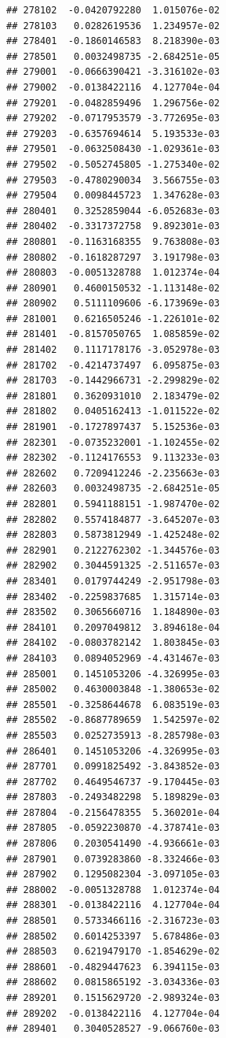 \begin{frame}[fragile]
\begin{verbatim}
## 278102  -0.0420792280  1.015076e-02
## 278103   0.0282619536  1.234957e-02
## 278401  -0.1860146583  8.218390e-03
## 278501   0.0032498735 -2.684251e-05
## 279001  -0.0666390421 -3.316102e-03
## 279002  -0.0138422116  4.127704e-04
## 279201  -0.0482859496  1.296756e-02
## 279202  -0.0717953579 -3.772695e-03
## 279203  -0.6357694614  5.193533e-03
## 279501  -0.0632508430 -1.029361e-03
## 279502  -0.5052745805 -1.275340e-02
## 279503  -0.4780290034  3.566755e-03
## 279504   0.0098445723  1.347628e-03
## 280401   0.3252859044 -6.052683e-03
## 280402  -0.3317372758  9.892301e-03
## 280801  -0.1163168355  9.763808e-03
## 280802  -0.1618287297  3.191798e-03
## 280803  -0.0051328788  1.012374e-04
## 280901   0.4600150532 -1.113148e-02
## 280902   0.5111109606 -6.173969e-03
## 281001   0.6216505246 -1.226101e-02
## 281401  -0.8157050765  1.085859e-02
## 281402   0.1117178176 -3.052978e-03
## 281702  -0.4214737497  6.095875e-03
## 281703  -0.1442966731 -2.299829e-02
## 281801   0.3620931010  2.183479e-02
## 281802   0.0405162413 -1.011522e-02
## 281901  -0.1727897437  5.152536e-03
## 282301  -0.0735232001 -1.102455e-02
## 282302  -0.1124176553  9.113233e-03
## 282602   0.7209412246 -2.235663e-03
## 282603   0.0032498735 -2.684251e-05
## 282801   0.5941188151 -1.987470e-02
## 282802   0.5574184877 -3.645207e-03
## 282803   0.5873812949 -1.425248e-02
## 282901   0.2122762302 -1.344576e-03
## 282902   0.3044591325 -2.511657e-03
## 283401   0.0179744249 -2.951798e-03
## 283402  -0.2259837685  1.315714e-03
## 283502   0.3065660716  1.184890e-03
## 284101   0.2097049812  3.894618e-04
## 284102  -0.0803782142  1.803845e-03
## 284103   0.0894052969 -4.431467e-03
## 285001   0.1451053206 -4.326995e-03
## 285002   0.4630003848 -1.380653e-02
## 285501  -0.3258644678  6.083519e-03
## 285502  -0.8687789659  1.542597e-02
## 285503   0.0252735913 -8.285798e-03
## 286401   0.1451053206 -4.326995e-03
## 287701   0.0991825492 -3.843852e-03
## 287702   0.4649546737 -9.170445e-03
## 287803  -0.2493482298  5.189829e-03
## 287804  -0.2156478355  5.360201e-04
## 287805  -0.0592230870 -4.378741e-03
## 287806   0.2030541490 -4.936661e-03
## 287901   0.0739283860 -8.332466e-03
## 287902   0.1295082304 -3.097105e-03
## 288002  -0.0051328788  1.012374e-04
## 288301  -0.0138422116  4.127704e-04
## 288501   0.5733466116 -2.316723e-03
## 288502   0.6014253397  5.678486e-03
## 288503   0.6219479170 -1.854629e-02
## 288601  -0.4829447623  6.394115e-03
## 288602   0.0815865192 -3.034336e-03
## 289201   0.1515629720 -2.989324e-03
## 289202  -0.0138422116  4.127704e-04
## 289401   0.3040528527 -9.066760e-03

\end{verbatim}
\end{frame}
